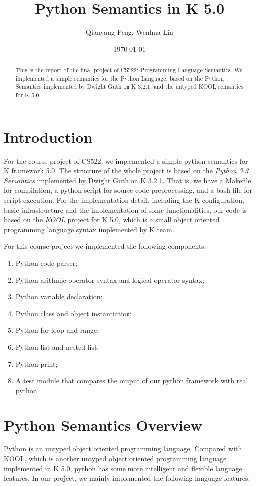 \documentclass[a4paper]{article}
\title{Python Semantics in K 5.0}
\author{Qianyang Peng, Wenhua Lin}
\date{\today}
\begin{document}
\maketitle

\begin{abstract}
This is the report of the final project of CS522: Programming Language Semantics. We implemented a simple semantics for the Python Language, based on the Python Semantics implemented by Dwight Guth on K 3.2.1, and the untyped KOOL semantics for K 5.0.
\end{abstract}

\section{Introduction}
For the course project of CS522, we implemented a simple python semantics for K framework 5.0. The structure of the whole project is based on the \emph{Python 3.3 Semantics} implemented by Dwight Guth on K 3.2.1. That is, we have a Makefile for compilation, a python script for source code preprocessing, and a bash file for script execution. For the implementation detail, including the K configuration, basic infrastructure and the implementation of some functionalities, our code is based on the \emph{KOOL} project for K 5.0, which is a small object oriented programming language syntax implemented by K team.

For this course project we implemented the following components:

\begin{enumerate}
    \item Python code parser;
    \item Python arithmic operator syntax and logical operator syntax;
    \item Python variable declaration;
    \item Python class and object instantiation;
    \item Python for loop and range;
    \item Python list and nested list;
    \item Python print;
    \item A test module that compares the output of our python framework with real python.
\end{enumerate}

\section{Python Semantics Overview}
Python is an untyped object oriented programming language. Compared with KOOL, which is another untyped object oriented programming language implemented in K 5.0, python has some more intelligent and flexible language features. In our project, we mainly implemented the following language features:
\end{document}
